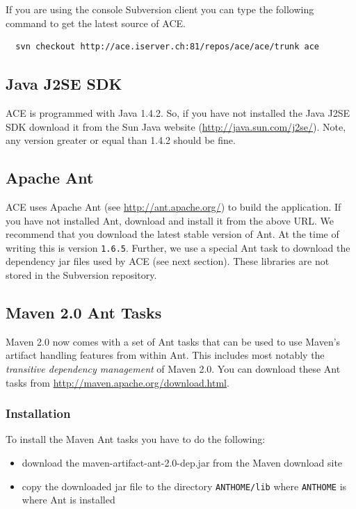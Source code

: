 \documentclass[11pt,a4paper]{article}
\begin{document}
If you are using the console Subversion client you can type the following command to get the latest source of ACE.

\small{\begin{verbatim}
  svn checkout http://ace.iserver.ch:81/repos/ace/ace/trunk ace
\end{verbatim}}


\subsection{Java J2SE SDK}
ACE is programmed with Java 1.4.2. So, if you have not installed the
Java J2SE SDK download it from the Sun Java website 
(\href{http://java.sun.com/j2se/}{http://java.sun.com/j2se/}). Note,
any version greater or equal than 1.4.2 should be fine.


\subsection{Apache Ant}
ACE uses Apache Ant (see \href{http://ant.apache.org/}{http://ant.apache.org/})
to build the application. If you have not installed Ant, download and install
it from the above URL. We recommend that you download the latest stable
version of Ant. At the time of writing this is version \texttt{1.6.5}.
Further, we use a special Ant task to download the
dependency jar files used by ACE (see next section). 
These libraries are not stored in the Subversion repository.


\subsection{Maven 2.0 Ant Tasks}
Maven 2.0 now comes with a set of Ant tasks that can be used to use Maven's
artifact handling features from within Ant. This includes most notably the
\emph{transitive dependency management} of Maven 2.0. You can
download these Ant tasks from \href{http://maven.apache.org/download.html}{http://maven.\-apache.\-org/\-download.\-html}.

\subsubsection{Installation}
To install the Maven Ant tasks you have to do the following:
\begin{itemize}
 \item download the maven-artifact-ant-2.0-dep.jar from the Maven download site
 \item copy the downloaded jar file to the directory \texttt{ANTHOME/lib} where \texttt{ANTHOME} is where Ant is installed
\end{itemize}
\end{document}
